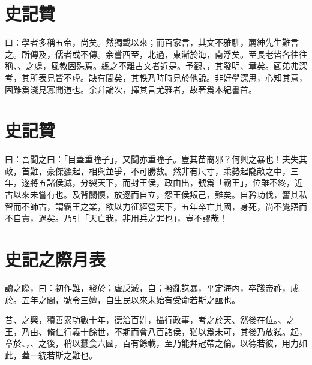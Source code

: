 \section[五帝本紀贊\quad{\small 史記}]{{\normalsize 史記}\quad {}贊}
曰：學者多稱五帝，尚矣。然獨載以來；而百家言，其文不雅馴，薦紳先生難言之。所傳及，儒者或不傳。余嘗西至，北過，東漸於海，南浮矣。至長老皆各往往稱、、之處，風教固殊焉。總之不離古文者近是。予觀、，其發明、章矣。顧弟弗深考，其所表見皆不虛。缺有間矣，其軼乃時時見於他說。非好學深思，心知其意，固難爲淺見寡聞道也。余幷論次，擇其言尤雅者，故著爲本紀書首。

\section[項羽本紀贊\quad{\small 史記}]{{\normalsize 史記}\quad{}贊}
曰：吾聞之曰：「目蓋重瞳子」，又聞亦重瞳子。豈其苗裔邪？何興之暴也！夫失其政，首難，豪傑蠭起，相與並爭，不可勝數。然非有尺寸，乘勢起隴畝之中，三年，遂將五諸侯滅，分裂天下，而封王侯，政由出，號爲「霸王」，位雖不終，近古以來未嘗有也。及背關懷，放逐而自立，怨王侯叛己，難矣。自矜功伐，奮其私智而不師古，謂霸王之業，欲以力征經營天下，五年卒亡其國，身死，尚不覺寤而不自責，過矣。乃引「天亡我，非用兵之罪也」，豈不謬哉！

\section[秦楚之際月表\quad{\small 史記}]{{\normalsize 史記}\quad{}之際月表}
讀之際，曰：初作難，發於；虐戾滅，自；撥亂誅暴，平定海內，卒踐帝祚，成於。五年之間，號令三嬗，自生民以來未始有受命若斯之亟也。

昔、之興，積善累功數十年，德洽百姓，攝行政事，考之於天、然後在位。、之王，乃由、脩仁行義十餘世，不期而會八百諸侯，猶以爲未可，其後乃放弒。起，章於、，、之後，稍以蠶食六國，百有餘載，至乃能幷冠帶之倫。以德若彼，用力如此，蓋一統若斯之難也。

